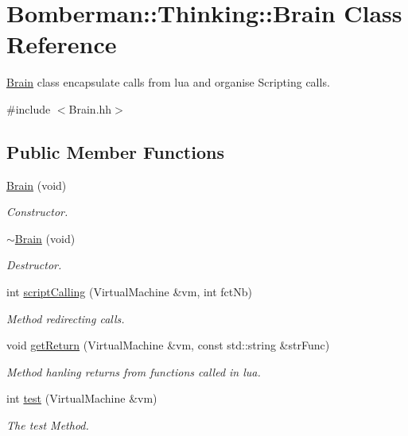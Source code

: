 \hypertarget{classBomberman_1_1Thinking_1_1Brain}{
\section{Bomberman::Thinking::Brain Class Reference}
\label{classBomberman_1_1Thinking_1_1Brain}
}


\hyperlink{classBomberman_1_1Thinking_1_1Brain}{Brain} class encapsulate calls from lua and organise Scripting calls.  




{\ttfamily \#include $<$Brain.hh$>$}

\subsection*{Public Member Functions}
\begin{DoxyCompactItemize}
\item 
\hyperlink{classBomberman_1_1Thinking_1_1Brain_a7f1f608a4157bf556c71e09e00352572}{Brain} (void)
\begin{DoxyCompactList}\small\item\em Constructor. \end{DoxyCompactList}\item 
\hyperlink{classBomberman_1_1Thinking_1_1Brain_a8a8eee0a0dd9d1e771d1e452496dead9}{$\sim$Brain} (void)
\begin{DoxyCompactList}\small\item\em Destructor. \end{DoxyCompactList}\item 
int \hyperlink{classBomberman_1_1Thinking_1_1Brain_a328b9de11566dedba18161aa82ca232b}{scriptCalling} (VirtualMachine \&vm, int fctNb)
\begin{DoxyCompactList}\small\item\em Method redirecting calls. \end{DoxyCompactList}\item 
void \hyperlink{classBomberman_1_1Thinking_1_1Brain_ab271bda1c21a134ab8aa375755439ba9}{getReturn} (VirtualMachine \&vm, const std::string \&strFunc)
\begin{DoxyCompactList}\small\item\em Method hanling returns from functions called in lua. \end{DoxyCompactList}\item 
int \hyperlink{classBomberman_1_1Thinking_1_1Brain_a8f68d82b0a73f1ff626e54f238d51cee}{test} (VirtualMachine \&vm)
\begin{DoxyCompactList}\small\item\em The test Method. \end{DoxyCompactList}\end{DoxyCompactItemize}


